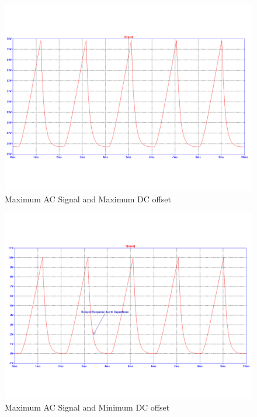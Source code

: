 \documentclass[12pt]{report}
\begin{document}
\begin{figure}[h!]
\centering
\includegraphics[width=\textwidth]{max_ssac_amp_dc.png}
\caption{Maximum AC Signal and Maximum DC offset}
\label{fig:maxmax}
\end{figure}

\begin{figure}[h!]
\centering
\includegraphics[width=\textwidth]{max_ssac_amp_no_dc.png}
\caption{Maximum AC Signal and Minimum DC offset}
\label{fig:maxmin}
\end{figure}
\end{document}
